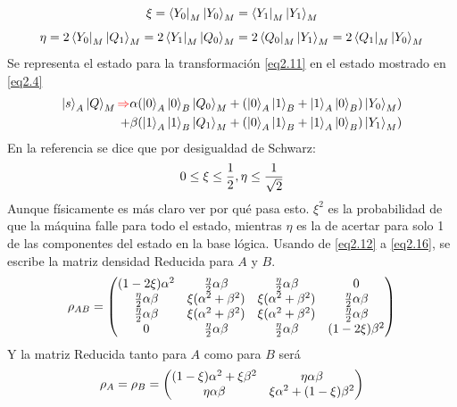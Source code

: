 \documentclass{book}
\begin{document}
\begin{equation}\label{eq2.17}{ \xi= \bra{Y_0}_M\ket{Y_0}_M=  \bra{Y_1}_M\ket{Y_1}_M }\end{equation}
\begin{equation}\label{eq2.18}{ \eta= 2\bra{Y_0}_M\ket{Q_1}_M= 2\bra{Y_1}_M\ket{Q_0}_M= 2\bra{Q_0}_M\ket{Y_1}_M= 2\bra{Q_1}_M\ket{Y_0}_M}\end{equation}
Se representa el estado para la transformación \textcolor{blue}{\ref{eq2.11}} en el estado mostrado en \textcolor{blue}{\ref{eq2.4}}
\begin{equation}\label{eq2.19}\begin{aligned}{\ket{s}_A\ket{Q}_M\textcolor{red}{\Rightarrow} \alpha(\ket{0}_A\ket{0}_B\ket{Q_0}_M+(\ket{0}_A\ket{1}_B+\ket{1}_A\ket{0}_B)\ket{Y_0}_M)}\\
{+\beta(\ket{1}_A\ket{1}_B\ket{Q_1}_M+(\ket{0}_A\ket{1}_B+\ket{1}_A\ket{0}_B)\ket{Y_1}_M)}\end{aligned}\end{equation}
En la referencia \textcolor{red}{\cite{bib1}} se dice que por desigualdad de Schwarz:
\begin{equation}{\label{eq2.20} 0\leq\xi\leq\frac{1}{2},\eta\leq\frac{1}{\sqrt{2}}}\end{equation}
Aunque físicamente es más claro ver por qué pasa esto. $\xi^2$ es la probabilidad de que la máquina falle para todo el estado, mientras $\eta$ es la de acertar para solo 1 de las componentes del estado en la base lógica. 
Usando de \textcolor{red}{\ref{eq2.12}} a \textcolor{red}{\ref{eq2.16}}, se escribe la matriz densidad Reducida para $A$ y $B$.
\begin{equation}{\label{eq2.21}\rho_{AB}=\begin{pmatrix} (1-2\xi)\alpha^2 & \frac{\eta}{2}\alpha\beta & \frac{\eta}{2}\alpha\beta & 0 \\ \frac{\eta}{2}\alpha\beta & \xi(\alpha^2+\beta^2) & \xi(\alpha^2+\beta^2) & \frac{\eta}{2}\alpha\beta \\ \frac{\eta}{2}\alpha\beta & \xi(\alpha^2+\beta^2) & \xi(\alpha^2+\beta^2) & \frac{\eta}{2} \alpha\beta \\ 0 & \frac{\eta}{2}\alpha\beta & \frac{\eta}{2}\alpha\beta & (1-2\xi)\beta^2 \end{pmatrix} }\end{equation}
Y la matriz Reducida tanto para $A$ como para $B$ será
\begin{equation}{\label{eq2.22}\rho_A=\rho_B=\begin{pmatrix} (1-\xi)\alpha^2+\xi\beta^2 & \eta\alpha\beta \\ \eta\alpha\beta & \xi\alpha^2 + (1-\xi)\beta^2 \end{pmatrix} }\end{equation}
\end{document}
